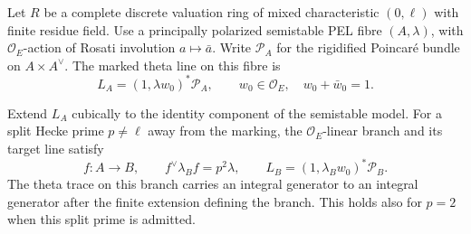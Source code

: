 


\begin{auxlemma}\label{lem:marked-hecke-semistable-unit}
Let \(R\) be a complete discrete valuation ring of mixed
characteristic \((0,\ell)\) with finite residue field. Use a
principally polarized semistable PEL fibre \((A,\lambda)\),
with \(\mathcal O_E\)-action of Rosati involution \(a\mapsto\bar a\).
Write \(\mathcal P_A\) for the rigidified Poincar\'e bundle on
\(A\times A^\vee\). The marked theta line on this fibre is
\[
 L_A=(1,\lambda w_0)^*\mathcal P_A,\qquad
            w_0\in\mathcal O_E,\quad w_0+\bar w_0=1 .
\]

Extend \(L_A\) cubically to the identity component of the
semistable model. For a split Hecke prime \(p\ne\ell\) away
from the marking, the \(\mathcal O_E\)-linear branch and its
target line satisfy
\[
       f:A\longrightarrow B,\qquad f^\vee\lambda_B f=p^2\lambda,
              \qquad L_B=(1,\lambda_Bw_0)^*\mathcal P_B .
\] The theta trace on this branch carries an integral
generator to an integral generator after the finite extension
defining the branch. This holds also for \(p=2\) when this split
prime is admitted.
\end{auxlemma}
